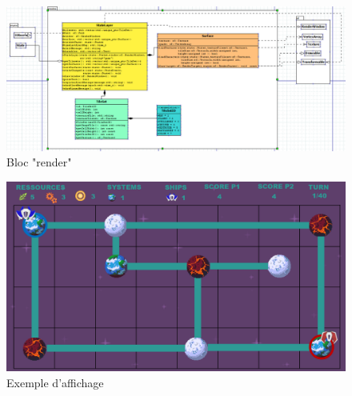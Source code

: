 \begin{figure}[!h]
\centering
\includegraphics[width=1\textwidth]{pics/render.PNG}
\caption[Bloc "render"]{\label{figure_simple}Bloc "render"}
\end{figure}

\begin{figure}[!h]
\centering
\includegraphics[width=1\textwidth]{pics/rendu.PNG}
\caption[Exemple d'affichage]{\label{figure_simple}Exemple d'affichage}
\end{figure}

